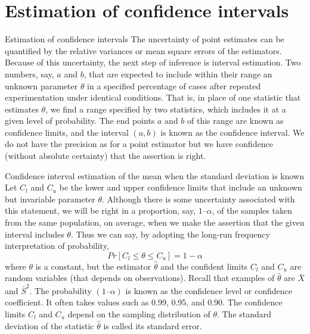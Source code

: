 \documentclass[8pt]{beamer}
\renewcommand{\emph}[1]{\textcolor{myorange}{#1}}
\begin{document}
\section{Estimation of confidence intervals}
\begin{frame}{Estimation of confidence intervals}
    The \emph{uncertainty} of point estimates can be quantified by the relative \emph{variances} or \emph{mean square errors} of the estimators. Because of this uncertainty, the next step of inference is \alert{interval estimation}. Two numbers, say, $a$ and $b$, that are expected to include within their range an unknown parameter $\theta$ in a specified percentage of cases after repeated experimentation under identical conditions. That is, in place of one statistic that estimates $\theta$, we find a range specified by two statistics, which includes it at a given level of probability. The end points $a$ and $b$ of this range are known as \alert{confidence limits}, and the interval $(a, b)$ is known as the \alert{confidence interval}. We do not have the precision as for a point estimator but we have confidence (without absolute certainty) that the assertion is right.

\begin{block}{Confidence interval estimation of the mean when the standard deviation is known}
    Let $C_l$ and $C_u$ be the \emph{lower} and \emph{upper} \emph{confidence limits} that include an unknown but invariable parameter $\theta$. Although there is some uncertainty associated with this statement, we will be right in a proportion, say, $1 – \alpha$, of the samples taken from the same population, on average, when we make the assertion that the given interval includes $\theta$. Thus we can say, by adopting the long-run frequency interpretation of probability,
\[
    Pr[C_l  \leq \theta \leq C_u ] = 1 - \alpha
\]
where $\theta$ is a constant, but the \emph{estimator} $\hat{\theta}$  and the \emph{confident limits} $C_l$ and $C_u$ are random variables (that depends on observations). Recall that examples of $\hat{\theta}$ are $\bar{X}$ and $\bar{S}^2$. The probability $(1 – \alpha)$ is known as the \emph{confidence level} or \emph{confidence coefficient}. It often takes values such as 0.99, 0.95, and 0.90. The \emph{confidence limits} $C_l$ and $C_u$ depend on the sampling distribution of $\theta$. The standard deviation of the statistic $\hat{\theta}$ is called its \emph{standard error}.

    \end{block}
\end{frame}
\end{document}
